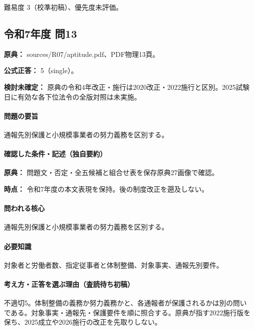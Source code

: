 \par 難易度 3（校準初稿）、優先度未評価。

\subsection{令和7年度 問13}
\label{q:r07-reg-apt-13}

\noindent\textbf{原典：} sources/R07/aptitude.pdf、PDF物理13頁。

\textbf{公式正答：} 5（single）。

\par\textbf{検討未確定：} 原典の令和4年改正・施行は2020改正・2022施行と区別。2025試験日に有効な各下位法令の全版対照は未実施。

\paragraph{問題の要旨} 通報先別保護と小規模事業者の努力義務を区別する。

\paragraph{確認した条件・記述（独自要約）}\mbox{}\par

\noindent\textbf{原典：} 問題文・否定・全五候補と組合せ表を保存原典27画像で確認。\par

\noindent\textbf{時点：} 令和7年度の本文表現を保持。後の制度改正を遡及しない。\par

\paragraph{問われる核心} 通報先別保護と小規模事業者の努力義務を区別する。

\paragraph{必要知識} 対象者と労働者数、指定従事者と体制整備、対象事実、通報先別要件。

\paragraph{考え方・正答を選ぶ理由（査読待ち初稿）} 不適切5。体制整備の義務か努力義務かと、各通報者が保護されるかは別の問いである。対象事実・通報先・保護要件を順に照合する。原典が指す2022施行版を保ち、2025成立や2026施行の改正を先取りしない。

